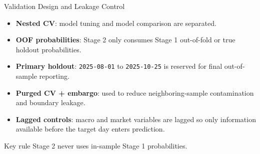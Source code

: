 \begin{frame}{Validation Design and Leakage Control}
  \begin{itemize}
    \item \textbf{Nested CV}: model tuning and model comparison are separated.
    \item \textbf{OOF probabilities}: Stage 2 only consumes Stage 1 out-of-fold or true holdout probabilities.
    \item \textbf{Primary holdout}: \texttt{2025-08-01} to \texttt{2025-10-25} is reserved for final out-of-sample reporting.
    \item \textbf{Purged CV + embargo}: used to reduce neighboring-sample contamination and boundary leakage.
    \item \textbf{Lagged controls}: macro and market variables are lagged so only information available before the target day enters prediction.
  \end{itemize}

  \hspace{1.4em}
  \begin{minipage}{0.86\textwidth}
    \begin{alertblock}{Key rule}
      Stage 2 never uses in-sample Stage 1 probabilities.
    \end{alertblock}
  \end{minipage}
\end{frame}
